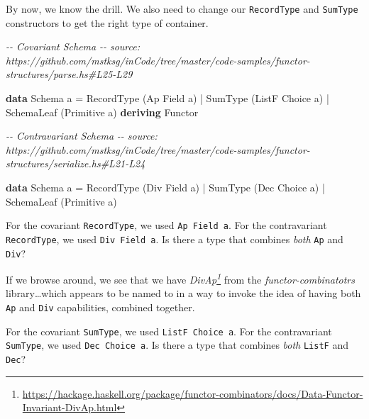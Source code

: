 \documentclass[]{article}
\newenvironment{Shaded}{}{}
\newcommand{\CommentTok}[1]{\textcolor[rgb]{0.38,0.63,0.69}{\textit{#1}}}
\newcommand{\DataTypeTok}[1]{\textcolor[rgb]{0.56,0.13,0.00}{#1}}
\newcommand{\KeywordTok}[1]{\textcolor[rgb]{0.00,0.44,0.13}{\textbf{#1}}}
\newcommand{\NormalTok}[1]{#1}
\newcommand{\OperatorTok}[1]{\textcolor[rgb]{0.40,0.40,0.40}{#1}}
\newcommand{\OtherTok}[1]{\textcolor[rgb]{0.00,0.44,0.13}{#1}}
\renewcommand{\href}[2]{#2\footnote{\url{#1}}}
\begin{document}
By now, we know the drill. We also need to change our \texttt{RecordType} and
\texttt{SumType} constructors to get the right type of container.

\begin{Shaded}
\begin{Highlighting}[]
\CommentTok{{-}{-} Covariant Schema}
\CommentTok{{-}{-} source: https://github.com/mstksg/inCode/tree/master/code{-}samples/functor{-}structures/parse.hs\#L25{-}L29}

\KeywordTok{data} \DataTypeTok{Schema}\NormalTok{ a }\OtherTok{=}
      \DataTypeTok{RecordType}\NormalTok{  (}\DataTypeTok{Ap}    \DataTypeTok{Field}\NormalTok{  a)}
    \OperatorTok{|} \DataTypeTok{SumType}\NormalTok{     (}\DataTypeTok{ListF} \DataTypeTok{Choice}\NormalTok{ a)}
    \OperatorTok{|} \DataTypeTok{SchemaLeaf}\NormalTok{  (}\DataTypeTok{Primitive}\NormalTok{ a)}
  \KeywordTok{deriving} \DataTypeTok{Functor}
\end{Highlighting}
\end{Shaded}

\begin{Shaded}
\begin{Highlighting}[]
\CommentTok{{-}{-} Contravariant Schema}
\CommentTok{{-}{-} source: https://github.com/mstksg/inCode/tree/master/code{-}samples/functor{-}structures/serialize.hs\#L21{-}L24}

\KeywordTok{data} \DataTypeTok{Schema}\NormalTok{ a }\OtherTok{=}
      \DataTypeTok{RecordType}\NormalTok{  (}\DataTypeTok{Div} \DataTypeTok{Field}\NormalTok{  a)}
    \OperatorTok{|} \DataTypeTok{SumType}\NormalTok{     (}\DataTypeTok{Dec} \DataTypeTok{Choice}\NormalTok{ a)}
    \OperatorTok{|} \DataTypeTok{SchemaLeaf}\NormalTok{  (}\DataTypeTok{Primitive}\NormalTok{ a)}
\end{Highlighting}
\end{Shaded}

For the covariant \texttt{RecordType}, we used \texttt{Ap\ Field\ a}. For the
contravariant \texttt{RecordType}, we used \texttt{Div\ Field\ a}. Is there a
type that combines \emph{both} \texttt{Ap} and \texttt{Div}?

If we browse around, we see that we have
\emph{\href{https://hackage.haskell.org/package/functor-combinators/docs/Data-Functor-Invariant-DivAp.html}{DivAp}}
from the \emph{functor-combinatotrs} library\ldots which appears to be named to
in a way to invoke the idea of having both \texttt{Ap} and \texttt{Div}
capabilities, combined together.

For the covariant \texttt{SumType}, we used \texttt{ListF\ Choice\ a}. For the
contravariant \texttt{SumType}, we used \texttt{Dec\ Choice\ a}. Is there a type
that combines \emph{both} \texttt{ListF} and \texttt{Dec}?
\end{document}
